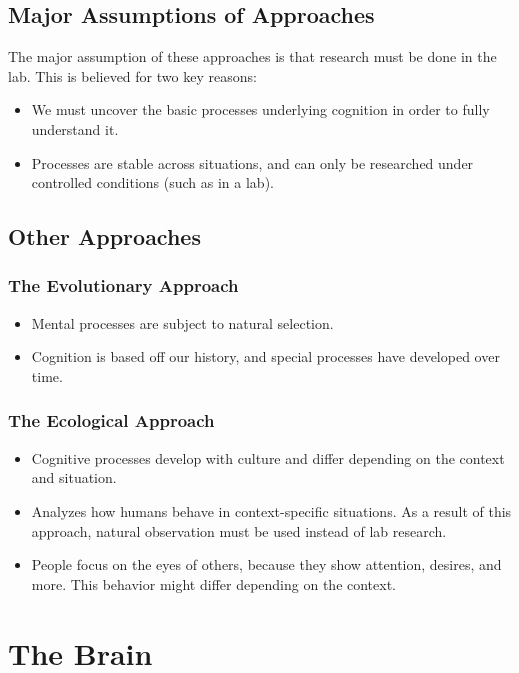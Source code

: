 \documentclass[]{article}
\newcommand{\lecture}[1]{\marginpar{{\footnotesize $\leftarrow$ \underline{#1}}}}
\begin{document}
		\subsection{Major Assumptions of Approaches}
			The major assumption of these approaches is that research must be done in the lab. This is believed for two key reasons:
			\begin{itemize}
				\item We must uncover the basic processes underlying cognition in order to fully understand it.
				\item Processes are stable across situations, and can only be researched under controlled conditions (such as in a lab).
			\end{itemize}

		\subsection{Other Approaches}
			\subsubsection{The Evolutionary Approach}
				\begin{itemize}
					\item Mental processes are subject to natural selection.
					\item Cognition is based off our history, and special processes have developed over time.
				\end{itemize}

			\subsubsection{The Ecological Approach}
				\begin{itemize}
					\item Cognitive processes develop with culture and differ depending on the context and situation.
					\item Analyzes how humans behave in context-specific situations. As a result of this approach, natural observation must be used instead of lab research.
					\item People focus on the eyes of others, because they show attention, desires, and more. This behavior might differ depending on the context.
				\end{itemize}
	\section{The Brain} \lecture{January 15, 2013}
\end{document}
